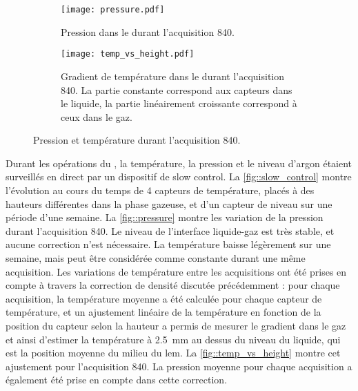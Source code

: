       \begin{figure}[htbp]
        \centering
        \begin{subfigure}[t]{0.48\textwidth}
          \centering
          \texttt{[image: pressure.pdf]}
          \caption{\label{fig::pressure}Pression dans le \TOO{} durant l'acquisition 840.}
        \end{subfigure}\hfill
        \begin{subfigure}[t]{0.48\textwidth}
          \centering
          \texttt{[image: temp\_vs\_height.pdf]}
          \caption{\label{fig::temp_vs_height}Gradient de température dans le \TOO{} durant l'acquisition 840. La partie constante correspond aux capteurs dans le liquide, la partie linéairement croissante correspond à ceux dans le gaz.}
        \end{subfigure}
        \caption[Pression et température durant l'acquisition 840]{Pression et température durant l'acquisition 840.}
      \end{figure}
      
      Durant les opérations du \TOO{}, la température, la pression et le niveau d'argon étaient surveillés en direct par un dispositif de slow control. La \autoref{fig::slow_control} montre l'évolution au cours du temps de 4 capteurs de température, placés à des hauteurs différentes dans la phase gazeuse, et d'un capteur de niveau sur une période d'une semaine. La \autoref{fig::pressure} montre les variation de la pression durant l'acquisition 840. Le niveau de l'interface liquide-gaz est très stable, et aucune correction n'est nécessaire. La température baisse légèrement sur une semaine, mais peut être considérée comme constante durant une même acquisition. Les variations de température entre les acquisitions ont été prises en compte à travers la correction de densité discutée précédemment : pour chaque acquisition, la température moyenne a été calculée pour chaque capteur de température, et un ajustement linéaire de la température en fonction de la position du capteur selon la hauteur a permis de mesurer le gradient dans le gaz et ainsi d'estimer la température à \SI{2.5}{\milli\meter} au dessus du niveau du liquide, qui est la position moyenne du milieu du \gls{lem}. La \autoref{fig::temp_vs_height} montre cet ajustement pour l'acquisition 840. La pression moyenne pour chaque acquisition a également été prise en compte dans cette correction.

